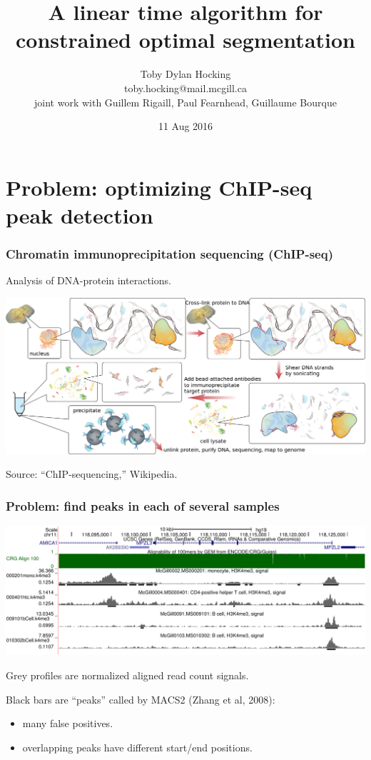 \documentclass{beamer}
\begin{document}
\title{A linear time algorithm for constrained 
optimal segmentation}

\author{
  Toby Dylan Hocking\\
  toby.hocking@mail.mcgill.ca\\
  joint work with Guillem Rigaill, Paul Fearnhead, 
  Guillaume Bourque}

\date{11 Aug 2016}

\maketitle

\section{Problem: optimizing ChIP-seq peak detection}

\begin{frame}
  \frametitle{Chromatin immunoprecipitation sequencing (ChIP-seq)}
  Analysis of DNA-protein interactions.

  \includegraphics[width=\textwidth]{Chromatin_immunoprecipitation_sequencing_wide.png}

  Source: ``ChIP-sequencing,'' Wikipedia.
\end{frame}

\begin{frame}
  \frametitle{Problem: find peaks in each of several samples}
  \includegraphics[width=\textwidth]{screenshot-ucsc-edited}

  Grey profiles are normalized aligned read count signals.

  Black bars are ``peaks'' called by MACS2 (Zhang et al, 2008):
  \begin{itemize}
  \item \alert<1>{many false positives}.
  \item overlapping peaks have different start/end positions.
  \end{itemize}
\end{frame}
\end{document}
